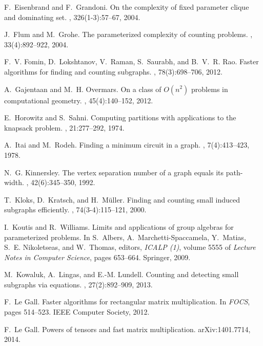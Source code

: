 \documentclass{amsart}
\begin{document}
\begin{thebibliography}{10}
F.~Eisenbrand and F.~Grandoni.
\newblock On the complexity of fixed parameter clique and dominating set.
, 326(1-3):57--67, 2004.

J.~Flum and M.~Grohe.
\newblock The parameterized complexity of counting problems.
, 33(4):892--922, 2004.

F.~V. Fomin, D.~Lokshtanov, V.~Raman, S.~Saurabh, and B.~V.~R. Rao.
\newblock Faster algorithms for finding and counting subgraphs.
, 78(3):698--706, 2012.

A.~Gajentaan and M.~H. Overmars.
\newblock On a class of {$O(n^2)$} problems in computational geometry.
, 45(4):140--152, 2012.

E.~Horowitz and S.~Sahni.
\newblock Computing partitions with applications to the knapsack problem.
, 21:277--292, 1974.

A.~Itai and M.~Rodeh.
\newblock Finding a minimum circuit in a graph.
, 7(4):413--423, 1978.

N.~G. Kinnersley.
\newblock The vertex separation number of a graph equals its path-width.
, 42(6):345--350, 1992.

T.~Kloks, D.~Kratsch, and H.~M{\"u}ller.
\newblock Finding and counting small induced subgraphs efficiently.
, 74(3-4):115--121, 2000.

I.~Koutis and R.~Williams.
\newblock Limits and applications of group algebras for parameterized problems.
\newblock In S.~Albers, A.~Marchetti-Spaccamela, Y.~Matias, S.~E. Nikoletseas,
  and W.~Thomas, editors, {\em ICALP (1)}, volume 5555 of {\em Lecture Notes in
  Computer Science}, pages 653--664. Springer, 2009.

M.~Kowaluk, A.~Lingas, and E.-M. Lundell.
\newblock Counting and detecting small subgraphs via equations.
, 27(2):892--909, 2013.

F.~{Le Gall}.
\newblock Faster algorithms for rectangular matrix multiplication.
\newblock In {\em FOCS}, pages 514--523. IEEE Computer Society, 2012.

F.~{Le Gall}.
\newblock Powers of tensors and fast matrix multiplication.
\newblock arXiv:1401.7714, 2014.


\end{thebibliography}
\end{document}
